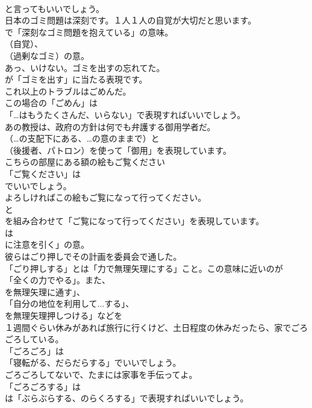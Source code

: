 \documentclass[8pt]{extreport}
\begin{document}
\begin{CJK}{UTF8}{min}
\\	と言ってもいいでしょう。	
\\	日本のゴミ問題は深刻です。１人１人の自覚が大切だと思います。 
\\	で「深刻なゴミ問題を抱えている」の意味。
\\	（自覚）、
\\	（過剰なゴミ）の意。	
\\	あっ、いけない。ゴミを出すの忘れてた。 
\\	が「ゴミを出す」に当たる表現です。	
\\	これ以上のトラブルはごめんだ。 
\\	この場合の「ごめん」は
\\	「…はもうたくさんだ、いらない」で表現すればいいでしょう。	
\\	あの教授は、政府の方針は何でも弁護する御用学者だ。 
\\	（…の支配下にある、…の意のままで）と
\\	（後援者、パトロン）を使って「御用」を表現しています。	
\\	こちらの部屋にある額の絵もご覧ください 
\\	「ご覧ください」は
\\	でいいでしょう。	
\\	よろしければこの絵もご覧になって行ってください。 
\\	と
\\	を組み合わせて「ご覧になって行ってください」を表現しています。
\\	は
\\	に注意を引く」の意。	
\\	彼らはごり押しでその計画を委員会で通した。 
\\	「ごり押しする」とは「力で無理矢理にする」こと。この意味に近いのが
\\	「全くの力でやる」。また、
\\	を無理矢理に通す」、
\\	「自分の地位を利用して...する」、
\\	を無理矢理押しつける」などを	
\\	１週間ぐらい休みがあれば旅行に行くけど、土日程度の休みだったら、家でごろごろしている。 
\\	「ごろごろ」は
\\	「寝転がる、だらだらする」でいいでしょう。	
\\	ごろごろしてないで、たまには家事を手伝ってよ。 
\\	「ごろごろする」は
\\	は「ぶらぶらする、のらくろする」で表現すればいいでしょう。	

\end{CJK}
\end{document}
